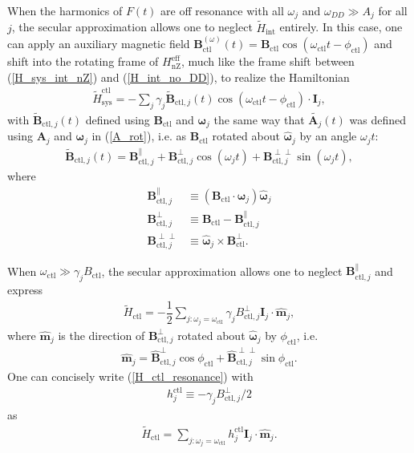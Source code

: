 \documentclass[twocolumn]{revtex4}
\renewcommand{\t}{\text} %
\newcommand{\f}[2]{\dfrac{#1}{#2}} %
\newcommand{\p}[1]{\left(#1\right)} %
\renewcommand{\v}{\bm} %
\newcommand{\uv}[1]{\hat{\v{#1}}} %
\renewcommand{\c}{\cdot} %
\begin{document}
When the harmonics of $F\p{t}$ are off resonance with all $\omega_j$
and $\omega_{DD}\gg A_j$ for all $j$, the secular approximation allows
one to neglect $\tilde H_\t{int}$ entirely. In this case, one can
apply an auxiliary magnetic field
$\v B_\t{ctl}^{\p\omega}\p{t}=\v
B_\t{ctl}\cos\p{\omega_\t{ctl}t-\phi_\t{ctl}}$ and shift into the
rotating frame of $H_\t{nZ}^\t{eff}$, much like the frame shift
between (\ref{H_sys_int_nZ}) and (\ref{H_int_no_DD}), to realize the
Hamiltonian
\begin{align}
  \tilde H_\t{sys}^\t{ctl} =
  -\sum_j\gamma_j\tilde{\v B}_{\t{ctl},j}\p{t}
  \cos\p{\omega_\t{ctl}t-\phi_\t{ctl}}\c\v I_j,
\end{align}
with $\tilde{\v B}_{\t{ctl},j}\p{t}$ defined using $\v B_\t{ctl}$ and
$\v\omega_j$ the same way that $\tilde{\v A_j}\p{t}$ was defined using
$\v A_j$ and $\v\omega_j$ in (\ref{A_rot}), i.e. as $\v B_\t{ctl}$
rotated about $\uv\omega_j$ by an angle $\omega_jt$:
\begin{align}
  \tilde{\v B}_{\t{ctl},j}\p{t} = \v B_{\t{ctl},j}^\parallel
  + \v B_{\t{ctl},j}^\perp\cos\p{\omega_jt}
  + \v B_{\t{ctl},j}^{\perp\perp}\sin\p{\omega_jt},
\end{align}
where
\begin{align}
  \v B_{\t{ctl},j}^\parallel
  &\equiv \p{\v B_\t{ctl} \c\uv\omega_j}\uv\omega_j \\
  \v B_{\t{ctl},j}^\perp
  &\equiv \v B_\t{ctl} - \v B_{\t{ctl},j}^\parallel \\
  \v B_{\t{ctl},j}^{\perp\perp}
  &\equiv \uv\omega_j\times\v B_\t{ctl}^\perp.
\end{align}

When $\omega_\t{ctl}\gg\gamma_jB_\t{ctl}$, the secular approximation
allows one to neglect $\v B_{\t{ctl},j}^\parallel$ and express
\begin{align}
  \tilde H_\t{ctl} = -\f12\sum_{j:\omega_j=\omega_\t{ctl}}
  \gamma_jB_{\t{ctl},j}^\perp \v I_j\c\uv m_j,
  \label{H_ctl_resonance}
\end{align}
where $\uv m_j$ is the direction of $\v B_{\t{ctl},j}^\perp$ rotated
about $\uv\omega_j$ by $\phi_\t{ctl}$, i.e.
\begin{align}
  \uv m_j = \uv B_{\t{ctl},j}^\perp\cos\phi_\t{ctl} +
  \uv B_{\t{ctl},j}^{\perp\perp}\sin\phi_\t{ctl}.
\end{align}
One can concisely write (\ref{H_ctl_resonance}) with
\begin{align}
h_j^\t{ctl}\equiv-\gamma_jB_{\t{ctl},j}^\perp/2
\end{align}
as
\begin{align}
  \tilde H_\t{ctl} = \sum_{j:\omega_j=\omega_\t{ctl}}
  h_j^\t{ctl}\v I_j\c\uv m_j.
  \label{H_ctl}
\end{align}
\end{document}
